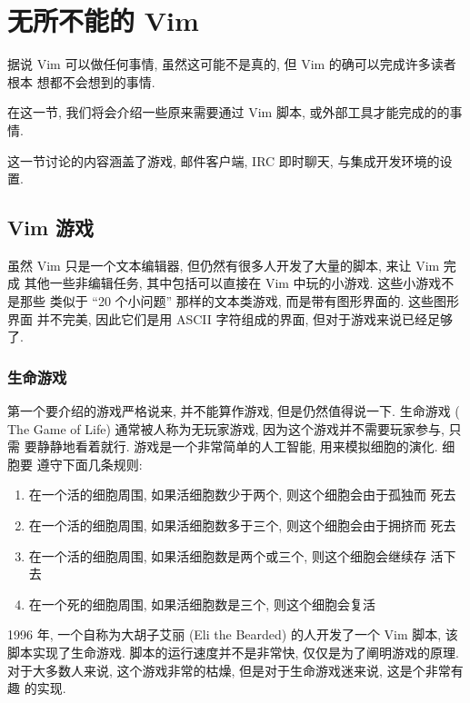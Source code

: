 \chapter{无所不能的 Vim}
\label{chap:vim_can_do_everything}

据说 Vim 可以做任何事情, 虽然这可能不是真的, 但 Vim 的确可以完成许多读者根本
想都不会想到的事情.

在这一节, 我们将会介绍一些原来需要通过 Vim 脚本, 或外部工具才能完成的的事情.

这一节讨论的内容涵盖了游戏, 邮件客户端, IRC 即时聊天, 与集成开发环境的设置.

\section{Vim 游戏}
\label{sec:vim_games}

虽然 Vim 只是一个文本编辑器, 但仍然有很多人开发了大量的脚本, 来让 Vim 完成
其他一些非编辑任务, 其中包括可以直接在 Vim 中玩的小游戏. 这些小游戏不是那些
类似于 ``20 个小问题'' 那样的文本类游戏, 而是带有图形界面的. 这些图形界面
并不完美, 因此它们是用 ASCII 字符组成的界面, 但对于游戏来说已经足够了.

\subsection{生命游戏}
\label{subsec:game_of_life}

第一个要介绍的游戏严格说来, 并不能算作游戏, 但是仍然值得说一下. 生命游戏 (
The Game of Life) 通常被人称为无玩家游戏, 因为这个游戏并不需要玩家参与, 只需
要静静地看着就行. 游戏是一个非常简单的人工智能, 用来模拟细胞的演化. 细胞要
遵守下面几条规则:
\begin{enumerate}
	\item 在一个活的细胞周围, 如果活细胞数少于两个, 则这个细胞会由于孤独而
		死去
	\item 在一个活的细胞周围, 如果活细胞数多于三个, 则这个细胞会由于拥挤而
		死去
	\item 在一个活的细胞周围, 如果活细胞数是两个或三个, 则这个细胞会继续存
		活下去
	\item 在一个死的细胞周围, 如果活细胞数是三个, 则这个细胞会复活
\end{enumerate}

1996 年, 一个自称为大胡子艾丽 (Eli the Bearded) 的人开发了一个 Vim 脚本, 该
脚本实现了生命游戏. 脚本的运行速度并不是非常快, 仅仅是为了阐明游戏的原理.
对于大多数人来说, 这个游戏非常的枯燥, 但是对于生命游戏迷来说, 这是个非常有趣
的实现.

